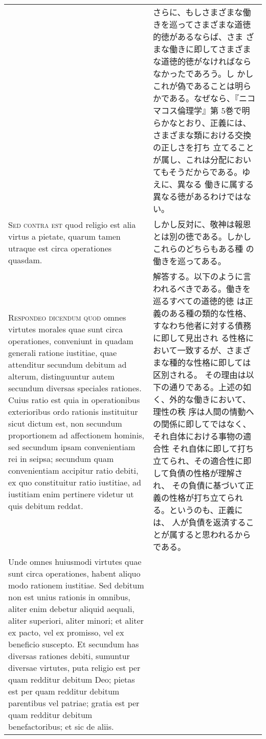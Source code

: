 \documentclass[10pt]{jsarticle}
\begin{document}
\begin{longtable}{p{21em}p{21em}}
&

さらに、もしさまざまな働きを巡ってさまざまな道徳的徳があるならば、さま
ざまな働きに即してさまざまな道徳的徳がなければならなかったであろう。し
かしこれが偽であることは明らかである。なぜなら、『ニコマコス倫理学』第
5巻で明らかなとおり、正義には、さまざまな類における交換の正しさを打ち
立てることが属し、これは分配においてもそうだからである。ゆえに、異なる
働きに属する異なる徳があるわけではない。
 
\\



{\scshape Sed contra est} quod religio est alia virtus a pietate,
quarum tamen utraque est circa operationes quasdam.


&

しかし反対に、敬神は報恩とは別の徳である。しかしこれらのどちらもある種
の働きを巡ってある。
 
\\

{\scshape Respondeo dicendum quod} omnes virtutes morales quae sunt
circa operationes, conveniunt in quadam generali ratione iustitiae,
quae attenditur secundum debitum ad alterum, distinguuntur autem
secundum diversas speciales rationes. Cuius ratio est quia in
operationibus exterioribus ordo rationis instituitur sicut dictum est,
non secundum proportionem ad affectionem hominis, sed secundum ipsam
convenientiam rei in seipsa; secundum quam convenientiam accipitur
ratio debiti, ex quo constituitur ratio iustitiae, ad iustitiam enim
pertinere videtur ut quis debitum reddat.


&

 解答する。以下のように言われるべきである。働きを巡るすべての道徳的徳
 は正義のある種の類的な性格、すなわち他者に対する債務に即して見出され
 る性格において一致するが、さまざまな種的な性格に即しては区別される。
 その理由は以下の通りである。上述の如く、外的な働きにおいて、理性の秩
 序は人間の情動への関係に即してではなく、それ自体における事物の適合性
 それ自体に即して打ち立てられ、その適合性に即して負債の性格が理解され、
 その負債に基づいて正義の性格が打ち立てられる。というのも、正義には、
 人が負債を返済することが属すると思われるからである。
 
\\

Unde omnes huiusmodi virtutes quae sunt circa operationes, habent
aliquo modo rationem iustitiae. Sed debitum non est unius rationis in
omnibus, aliter enim debetur aliquid aequali, aliter superiori, aliter
minori; et aliter ex pacto, vel ex promisso, vel ex beneficio
suscepto. Et secundum has diversas rationes debiti, sumuntur diversae
virtutes, puta religio est per quam redditur debitum Deo; pietas est
per quam redditur debitum parentibus vel patriae; gratia est per quam
redditur debitum benefactoribus; et sic de aliis.


\end{longtable}
\end{document}
